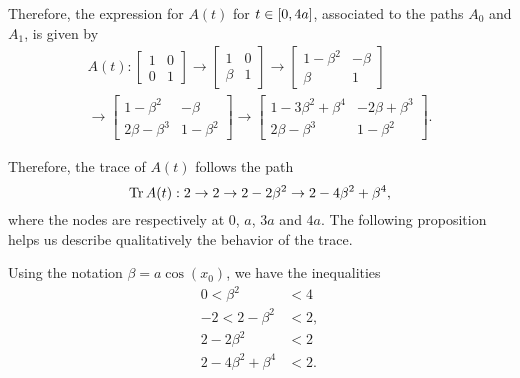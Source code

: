 Therefore, the expression for $A(t)$ for $t \in \interval 0 {4a}$, associated to the paths $A_0$ and $A_1$, is given by
\begin{equation}
\begin{multlined}
A(t) :
\begin{bmatrix}
1 & 0\\
0 & 1
\end{bmatrix}
\to
\begin{bmatrix}
1 & 0\\
\beta & 1
\end{bmatrix}
\to
\begin{bmatrix}
1 - \beta^2 &  -\beta \\
\beta & 1
\end{bmatrix}\\
\to
\begin{bmatrix}
1 - \beta^2 &  -\beta \\
2 \beta - \beta^3 & 1 - \beta^2
\end{bmatrix}
\to
\begin{bmatrix}
1 - 3 \beta^2 + \beta^4 &  -2 \beta + \beta^3 \\
2 \beta - \beta^3 & 1 - \beta^2
\end{bmatrix}.
\end{multlined}
\end{equation}

Therefore, the trace of $A(t)$ follows the path
\begin{equation}
\operatorname{Tr} A(t) : 2 \to 2 \to 2 - 2\beta^2 \to 2 - 4 \beta^2 + \beta^4,
\end{equation}
where the nodes are respectively at $0$, $a$, $3a$ and $4a$. The following proposition helps us describe qualitatively the behavior of the trace.

\begin{prop}
Using the notation $\beta = a \cos(x_0)$, we have the inequalities
\begin{align}
\label{beta1} 0 < \beta^2 &< 4\\
\label{beta2} -2 < 2 - \beta^2 &< 2,\\
\label{beta3} 2-2\beta^2 &< 2\\
\label{beta4} 2 - 4 \beta^2 + \beta^4 &< 2.
\end{align}
\end{prop}

